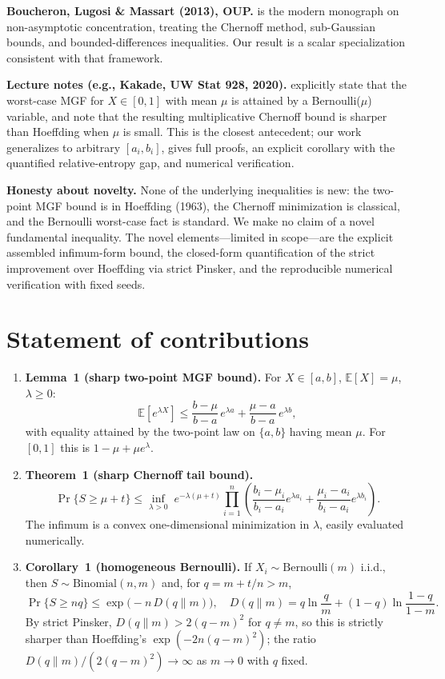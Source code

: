 \documentclass[11pt]{article}
\begin{document}
\textbf{Boucheron, Lugosi \& Massart (2013), OUP.} \cite{Boucheron2013} is the modern monograph on non-asymptotic concentration, treating the Chernoff method, sub-Gaussian bounds, and bounded-differences inequalities. Our result is a scalar specialization consistent with that framework.

\textbf{Lecture notes (e.g., Kakade, UW Stat 928, 2020).} \cite{Kakade2020} explicitly state that the worst-case MGF for $X\in[0,1]$ with mean $\mu$ is attained by a Bernoulli($\mu$) variable, and note that the resulting multiplicative Chernoff bound is sharper than Hoeffding when $\mu$ is small. This is the closest antecedent; our work generalizes to arbitrary $[a_i,b_i]$, gives full proofs, an explicit corollary with the quantified relative-entropy gap, and numerical verification.

\textbf{Honesty about novelty.} None of the underlying inequalities is new: the two-point MGF bound is in Hoeffding (1963), the Chernoff minimization is classical, and the Bernoulli worst-case fact is standard. We make no claim of a novel fundamental inequality. The novel elements---limited in scope---are the explicit assembled infimum-form bound, the closed-form quantification of the strict improvement over Hoeffding via strict Pinsker, and the reproducible numerical verification with fixed seeds.

\section{Statement of contributions}

\begin{enumerate}
\item \textbf{Lemma~1 (sharp two-point MGF bound).} For $X\in[a,b]$, $\mathbb{E}[X]=\mu$, $\lambda\ge0$:
\[
\mathbb{E}[e^{\lambda X}]\le \frac{b-\mu}{b-a}\,e^{\lambda a}+\frac{\mu-a}{b-a}\,e^{\lambda b},
\]
with equality attained by the two-point law on $\{a,b\}$ having mean $\mu$. For $[0,1]$ this is $1-\mu+\mu e^\lambda$.

\item \textbf{Theorem~1 (sharp Chernoff tail bound).}
\[
\Pr\{S\ge\mu+t\}\le \inf_{\lambda>0}\;
e^{-\lambda(\mu+t)}\prod_{i=1}^n
\left(\frac{b_i-\mu_i}{b_i-a_i}e^{\lambda a_i}
+\frac{\mu_i-a_i}{b_i-a_i}e^{\lambda b_i}\right).
\]
The infimum is a convex one-dimensional minimization in $\lambda$, easily evaluated numerically.

\item \textbf{Corollary~1 (homogeneous Bernoulli).} If $X_i\sim\mathrm{Bernoulli}(m)$ i.i.d., then $S\sim\mathrm{Binomial}(n,m)$ and, for $q=m+t/n>m$,
\[
\Pr\{S\ge nq\}\le \exp\!\big(-n\,D(q\|m)\big),
\quad D(q\|m)=q\ln\frac{q}{m}+(1-q)\ln\frac{1-q}{1-m}.
\]
By strict Pinsker, $D(q\|m)>2(q-m)^2$ for $q\neq m$, so this is strictly sharper than Hoeffding's $\exp(-2n(q-m)^2)$; the ratio $D(q\|m)/(2(q-m)^2)\to\infty$ as $m\to0$ with $q$ fixed.
\end{enumerate}
\end{document}
